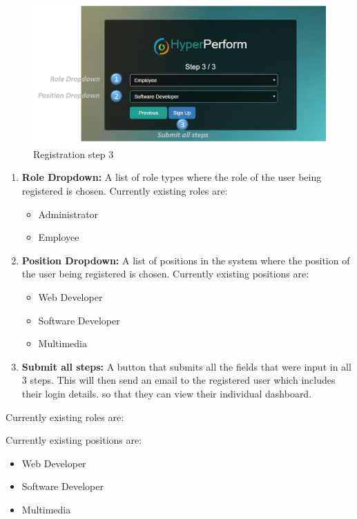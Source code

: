 \documentclass[11pt,a4paper]{article}
\begin{document}
\begin{figure}[H]
	\begin{center}
		\includegraphics[width=\linewidth]{../Images/Getting_Started/Step_3_numbered}
		\caption{Registration step 3}
	\end{center}
\end{figure}
\begin{enumerate}
	\item \textbf{Role Dropdown:} A list of role types where the role of the user being registered is chosen. Currently existing roles are:
	\begin{itemize}
		\item Administrator
		\item Employee
	\end{itemize}
	\item \textbf{Position Dropdown:} A list of positions in the system where the position of the user being registered is chosen. Currently existing positions are:
	\begin{itemize}
		\item Web Developer
		\item Software Developer
		\item Multimedia
	\end{itemize}
	\item \textbf{Submit all steps:} A button that submits all the fields that were input in all 3 steps. This will then send an email to the registered user which includes their login details. so that they can view their individual dashboard.
\end{enumerate}

\noindent
Currently existing roles are:

\noindent
Currently existing positions are:
\begin{itemize}
	\item Web Developer
	\item Software Developer
	\item Multimedia
\end{itemize}
\end{document}
